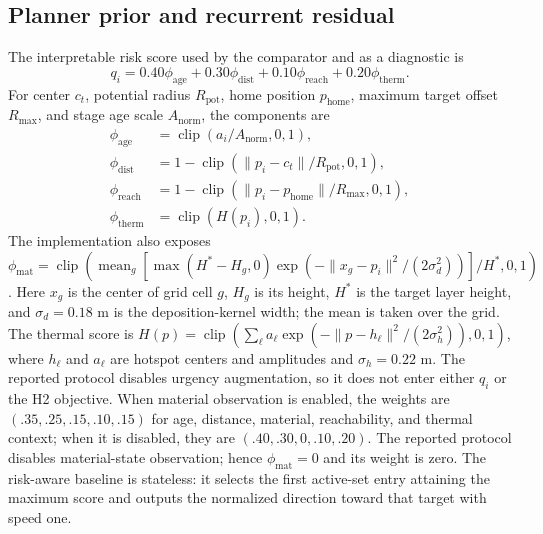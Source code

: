 \documentclass[conference]{IEEEtran}
\begin{document}
\subsection{Planner prior and recurrent residual}
The interpretable risk score used by the comparator and as a diagnostic is
\begin{equation}
q_i=0.40\phi_{\mathrm{age}}+0.30\phi_{\mathrm{dist}}
    +0.10\phi_{\mathrm{reach}}+0.20\phi_{\mathrm{therm}}.
\end{equation}
For center $c_t$, potential radius $R_{\mathrm{pot}}$, home position
$p_{\mathrm{home}}$, maximum target offset $R_{\max}$, and stage age scale
$A_{\mathrm{norm}}$, the components are
\begin{align}
\phi_{\mathrm{age}}&=\operatorname{clip}(a_i/A_{\mathrm{norm}},0,1),\nonumber\\
\phi_{\mathrm{dist}}&=1-\operatorname{clip}(\|p_i-c_t\|/R_{\mathrm{pot}},0,1),\nonumber\\
\phi_{\mathrm{reach}}&=1-\operatorname{clip}(\|p_i-p_{\mathrm{home}}\|/R_{\max},0,1),\nonumber\\
\phi_{\mathrm{therm}}&=\operatorname{clip}(H(p_i),0,1).
\end{align}
The implementation also exposes
$\phi_{\mathrm{mat}}=\operatorname{clip}(\operatorname{mean}_g
[\max(H^*-H_g,0)\exp(-\|x_g-p_i\|^2/(2\sigma_d^2))]/H^*,0,1)$.
Here $x_g$ is the center of grid cell $g$, $H_g$ is its height, $H^*$ is the
target layer height, and $\sigma_d=0.18$ m is the deposition-kernel width;
the mean is taken over the grid.
The thermal score is
$H(p)=\operatorname{clip}(\sum_\ell a_\ell\exp(-\|p-h_\ell\|^2/(2\sigma_h^2)),0,1)$,
where $h_\ell$ and $a_\ell$ are hotspot centers and amplitudes and
$\sigma_h=0.22$ m. The reported protocol disables urgency augmentation, so it
does not enter either $q_i$ or the H2 objective.
When material observation is enabled, the weights are
$(.35,.25,.15,.10,.15)$ for age, distance, material, reachability, and
thermal context; when it is disabled, they are
$(.40,.30,0,.10,.20)$.
The reported protocol disables material-state observation; hence
$\phi_{\mathrm{mat}}=0$ and its weight is zero. The risk-aware baseline is
stateless: it selects the first active-set entry attaining the maximum score
and outputs the normalized direction toward that target with speed one.
\end{document}
